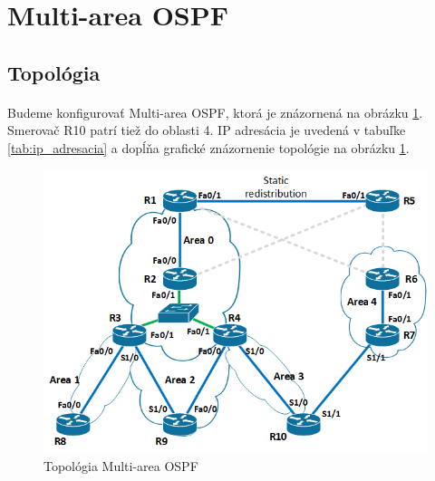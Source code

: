 \documentclass[12pt,twoside,a4paper]{article}
\begin{document}

\section*{Multi-area OSPF}
\subsection*{Topológia}
\paragraph{}
Budeme konfigurovať Multi-area OSPF, ktorá je znázornená na obrázku \ref{fig:multiarea_ospf_topo}. Smerovač R10 patrí tiež do oblasti 4. IP adresácia je uvedená v tabuľke \ref{tab:ip_adresacia} a dopĺňa grafické znázornenie topológie na obrázku \ref{fig:multiarea_ospf_topo}.

\begin{figure}[!htb]
\centering
\includegraphics[width=12cm,keepaspectratio]{multiarea_ospf_topo}
\caption{Topológia Multi-area OSPF}
\label{fig:multiarea_ospf_topo}
\end{figure}
\end{document}
